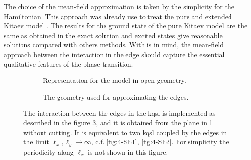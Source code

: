 The choice of the mean-field approximation is taken by the simplicity for the Hamiltonian. This approach was already use to treat the pure and extended Kitaev model \cite{Nasu_2018,Knolle_2018}. The results for the ground state of the pure Kitaev model are the same as obtained in the exact solution and excited states give reasonable solutions compared with others methods. With is in mind, the mean-field approach between the interaction in the edge should capture the essential qualitative features of the phase transition.



\begin{figure}[t]
    \centering
    \begin{subfigure}{.4\textwidth}
        \centering
          \scalebox{1}{ } 
        \caption{Representation for the model in open geometry.}
        \label{fig:4-open-geo}
    \end{subfigure}%
    \begin{subfigure}{.6\textwidth}
        \centering
        \scalebox{1.6}{ } 
        \caption{The geometry used for approximating the edges.}
        \label{fig:4-cylinder}
    \end{subfigure}
\caption{ The interaction between the edges in the \acrshort{kqsl} is implemented as described in the figure \ref{fig:4-cylinder}, and it is obtained from the plane in \ref{fig:4-open-geo} without cutting. It is equivalent to two \acrshort{kqsl} coupled by the edges in the limit $\ell_x,\ell_y \to \infty$, c.f. \ref{fig:4-SE1}, \ref{fig:4-SE2}. For simplicity the periodicity along $\ell_x$ is not shown in this figure. %
}
\end{figure}

